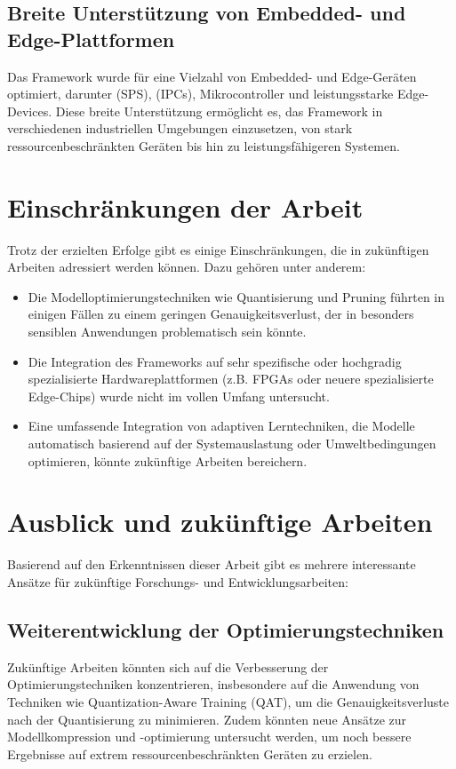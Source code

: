 \subsection{Breite Unterstützung von Embedded- und Edge-Plattformen}
Das Framework wurde für eine Vielzahl von Embedded- und Edge-Geräten optimiert, darunter \SPS (SPS), \IPC (IPCs), 
Mikrocontroller und leistungsstarke Edge-Devices. Diese breite Unterstützung ermöglicht es, das Framework in verschiedenen 
industriellen Umgebungen einzusetzen, von stark ressourcenbeschränkten Geräten bis hin zu leistungsfähigeren Systemen.

\section{Einschränkungen der Arbeit}
Trotz der erzielten Erfolge gibt es einige Einschränkungen, die in zukünftigen Arbeiten adressiert werden können. Dazu gehören unter anderem:
\begin{itemize}
    \item Die Modelloptimierungstechniken wie Quantisierung und Pruning führten in einigen Fällen zu einem geringen Genauigkeitsverlust, 
    der in besonders sensiblen Anwendungen problematisch sein könnte.
    \item Die Integration des Frameworks auf sehr spezifische oder hochgradig spezialisierte Hardwareplattformen 
    (z.B. FPGAs oder neuere spezialisierte Edge-Chips) wurde nicht im vollen Umfang untersucht.
    \item Eine umfassende Integration von adaptiven Lerntechniken, die Modelle automatisch basierend auf der Systemauslastung oder 
    Umweltbedingungen optimieren, könnte zukünftige Arbeiten bereichern.
\end{itemize}

\section{Ausblick und zukünftige Arbeiten}
Basierend auf den Erkenntnissen dieser Arbeit gibt es mehrere interessante Ansätze für zukünftige Forschungs- und Entwicklungsarbeiten:

\subsection{Weiterentwicklung der Optimierungstechniken}
Zukünftige Arbeiten könnten sich auf die Verbesserung der Optimierungstechniken konzentrieren, insbesondere auf die Anwendung von Techniken 
wie Quantization-Aware Training (QAT), um die Genauigkeitsverluste nach der Quantisierung zu minimieren. Zudem könnten neue Ansätze 
zur Modellkompression und -optimierung untersucht werden, um noch bessere Ergebnisse auf extrem ressourcenbeschränkten Geräten zu erzielen.

